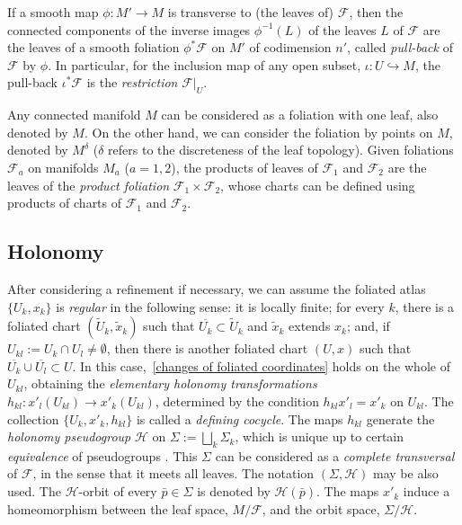 \documentclass{memo-l}
\theoremstyle{plain}
\theoremstyle{definition}
\theoremstyle{remark}
\newcommand{\FF}{\mathcal{F}}
\newcommand{\HH}{\mathcal{H}}
\numberwithin{section}{chapter}
\numberwithin{equation}{section}%
\begin{document}
If a smooth map $\phi:M'\to M$ is transverse to (the leaves of) $\FF$, then the connected components of the inverse images $\phi^{-1}(L)$ of the leaves $L$ of $\FF$ are the leaves of a smooth foliation $\phi^*\FF$ on $M'$ of codimension $n'$, called \emph{pull-back} of $\FF$ by $\phi$. In particular, for the inclusion map of any open subset, $\iota:U\hookrightarrow M$, the pull-back $\iota^*\FF$ is the \emph{restriction} $\FF|_U$.

Any connected manifold $M$ can be considered as a foliation with one leaf, also denoted by $M$. On the other hand, we can consider the foliation by points on $M$, denoted by $M^\delta$ ($\delta$ refers to the discreteness of the leaf topology). Given foliations $\FF_a$ on manifolds $M_a$ ($a=1,2$), the products of leaves of $\FF_1$ and $\FF_2$ are the leaves of the \emph{product foliation} $\FF_1\times\FF_2$, whose charts can be defined using products of charts of $\FF_1$ and $\FF_2$. 


\subsection{Holonomy}\label{ss: holonomy}

After considering a refinement if necessary, we can assume the foliated atlas $\{U_k,x_k\}$ is \emph{regular} in the following sense: it is locally finite; for every $k$, there is a foliated chart $(\widetilde U_k,\tilde x_k)$ such that $\overline{U_k}\subset\widetilde U_k$ and $\tilde x_k$ extends $x_k$; and, if $U_{kl}:=U_k\cap U_l\ne\emptyset$, then there is another foliated chart $(U,x)$ such that $\overline{U_k}\cup\overline{U_l}\subset U$. In this case,~\eqref{changes of foliated coordinates} holds on the whole of $U_{kl}$, obtaining the \emph{elementary holonomy transformations} $h_{kl}:x'_l(U_{kl})\to x'_k(U_{kl})$, determined by the condition $h_{kl}x'_l=x'_k$ on $U_{kl}$. The collection $\{U_k,x'_k,h_{kl}\}$ is called a \emph{defining cocycle}. The maps $h_{kl}$ generate the \emph{holonomy pseudogroup}  $\HH$ \index{$\HH$} on $\Sigma:=\bigsqcup_k\Sigma_k$, \index{$\Sigma$} which is unique up to certain \emph{equivalence} of pseudogroups \cite{Haefliger1980}. This $\Sigma$ can be considered as a \emph{complete transversal} of $\FF$, in the sense that it meets all leaves. The notation $(\Sigma,\HH)$ may be also used.  The $\HH$-orbit of every $\bar p\in\Sigma$ is denoted by $\HH(\bar p)$. The maps $x'_k$ induce a homeomorphism between the leaf space, $M/\FF$, and the orbit space, $\Sigma/\HH$.
\end{document}
